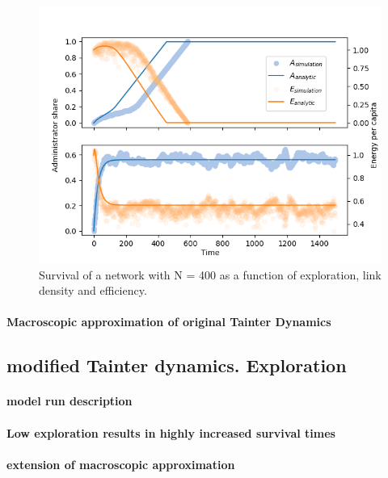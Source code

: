 \begin{figure}[htb]
    \centering
    \includegraphics[width = \linewidth]{../figures/comp_integration-model_exploration.png}
    \caption{Survival of a network with N = 400 as a function of exploration, link density and efficiency.}
    \label{fig:survival}
\end{figure}


\paragraph{Macroscopic approximation of original Tainter Dynamics}


\subsection{modified Tainter dynamics. Exploration}

\paragraph{model run description}

\paragraph{Low exploration results in highly increased survival times}

\paragraph{extension of macroscopic approximation}
